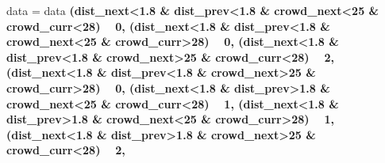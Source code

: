 \documentclass[
]{article}
\newenvironment{Shaded}{\begin{snugshade}}{\end{snugshade}}
\newcommand{\DataTypeTok}[1]{\textcolor[rgb]{0.13,0.29,0.53}{#1}}
\newcommand{\DecValTok}[1]{\textcolor[rgb]{0.00,0.00,0.81}{#1}}
\newcommand{\FloatTok}[1]{\textcolor[rgb]{0.00,0.00,0.81}{#1}}
\newcommand{\KeywordTok}[1]{\textcolor[rgb]{0.13,0.29,0.53}{\textbf{#1}}}
\newcommand{\NormalTok}[1]{#1}
\newcommand{\OperatorTok}[1]{\textcolor[rgb]{0.81,0.36,0.00}{\textbf{#1}}}
\newcommand{\StringTok}[1]{\textcolor[rgb]{0.31,0.60,0.02}{#1}}
\begin{document}
\begin{Shaded}
\begin{Highlighting}[]
\NormalTok{data =}\StringTok{ }\NormalTok{data }\OperatorTok{%>%}\StringTok{ }\KeywordTok{mutate}\NormalTok{(.,}\DataTypeTok{indicate =} \KeywordTok{with}\NormalTok{(.,}\KeywordTok{case_when}\NormalTok{(}
\NormalTok{  (dist_next}\OperatorTok{<}\FloatTok{1.8} \OperatorTok{&}\StringTok{ }\NormalTok{dist_prev}\OperatorTok{<}\FloatTok{1.8} \OperatorTok{&}\StringTok{ }\NormalTok{crowd_next}\OperatorTok{<}\DecValTok{25} \OperatorTok{&}\StringTok{ }\NormalTok{crowd_curr}\OperatorTok{<}\DecValTok{28}\NormalTok{) }\OperatorTok{~}\StringTok{ }\DecValTok{0}\NormalTok{,}
\NormalTok{  (dist_next}\OperatorTok{<}\FloatTok{1.8} \OperatorTok{&}\StringTok{ }\NormalTok{dist_prev}\OperatorTok{<}\FloatTok{1.8} \OperatorTok{&}\StringTok{ }\NormalTok{crowd_next}\OperatorTok{<}\DecValTok{25} \OperatorTok{&}\StringTok{ }\NormalTok{crowd_curr}\OperatorTok{>}\DecValTok{28}\NormalTok{) }\OperatorTok{~}\StringTok{ }\DecValTok{0}\NormalTok{,}
\NormalTok{  (dist_next}\OperatorTok{<}\FloatTok{1.8} \OperatorTok{&}\StringTok{ }\NormalTok{dist_prev}\OperatorTok{<}\FloatTok{1.8} \OperatorTok{&}\StringTok{ }\NormalTok{crowd_next}\OperatorTok{>}\DecValTok{25} \OperatorTok{&}\StringTok{ }\NormalTok{crowd_curr}\OperatorTok{<}\DecValTok{28}\NormalTok{) }\OperatorTok{~}\StringTok{ }\DecValTok{2}\NormalTok{,}
\NormalTok{  (dist_next}\OperatorTok{<}\FloatTok{1.8} \OperatorTok{&}\StringTok{ }\NormalTok{dist_prev}\OperatorTok{<}\FloatTok{1.8} \OperatorTok{&}\StringTok{ }\NormalTok{crowd_next}\OperatorTok{>}\DecValTok{25} \OperatorTok{&}\StringTok{ }\NormalTok{crowd_curr}\OperatorTok{>}\DecValTok{28}\NormalTok{) }\OperatorTok{~}\StringTok{ }\DecValTok{0}\NormalTok{,}
\NormalTok{  (dist_next}\OperatorTok{<}\FloatTok{1.8} \OperatorTok{&}\StringTok{ }\NormalTok{dist_prev}\OperatorTok{>}\FloatTok{1.8} \OperatorTok{&}\StringTok{ }\NormalTok{crowd_next}\OperatorTok{<}\DecValTok{25} \OperatorTok{&}\StringTok{ }\NormalTok{crowd_curr}\OperatorTok{<}\DecValTok{28}\NormalTok{) }\OperatorTok{~}\StringTok{ }\DecValTok{1}\NormalTok{,}
\NormalTok{  (dist_next}\OperatorTok{<}\FloatTok{1.8} \OperatorTok{&}\StringTok{ }\NormalTok{dist_prev}\OperatorTok{>}\FloatTok{1.8} \OperatorTok{&}\StringTok{ }\NormalTok{crowd_next}\OperatorTok{<}\DecValTok{25} \OperatorTok{&}\StringTok{ }\NormalTok{crowd_curr}\OperatorTok{>}\DecValTok{28}\NormalTok{) }\OperatorTok{~}\StringTok{ }\DecValTok{1}\NormalTok{,}
\NormalTok{  (dist_next}\OperatorTok{<}\FloatTok{1.8} \OperatorTok{&}\StringTok{ }\NormalTok{dist_prev}\OperatorTok{>}\FloatTok{1.8} \OperatorTok{&}\StringTok{ }\NormalTok{crowd_next}\OperatorTok{>}\DecValTok{25} \OperatorTok{&}\StringTok{ }\NormalTok{crowd_curr}\OperatorTok{<}\DecValTok{28}\NormalTok{) }\OperatorTok{~}\StringTok{ }\DecValTok{2}\NormalTok{,}
}
\end{Highlighting}
\end{Shaded}
\end{document}
